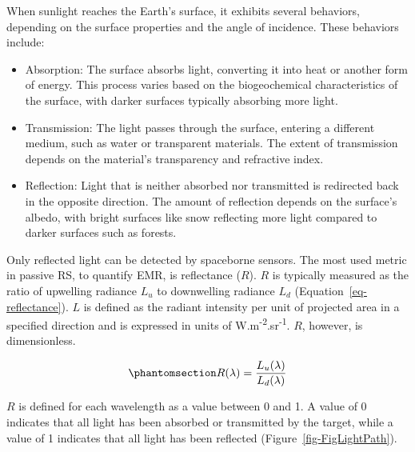 \documentclass[
  letterpaper,
  11pt,
  english,
  singlespacing,
  headsepline]{MastersDoctoralThesis}
\begin{document}
\begin{spacing}{1.5}
When sunlight reaches the Earth's surface, it exhibits several
behaviors, depending on the surface properties and the angle of
incidence. These behaviors include:

\begin{itemize}
\item
  Absorption: The surface absorbs light, converting it into heat or
  another form of energy. This process varies based on the
  biogeochemical characteristics of the surface, with darker surfaces
  typically absorbing more light.
\item
  Transmission: The light passes through the surface, entering a
  different medium, such as water or transparent materials. The extent
  of transmission depends on the material's transparency and refractive
  index.
\item
  Reflection: Light that is neither absorbed nor transmitted is
  redirected back in the opposite direction. The amount of reflection
  depends on the surface's albedo, with bright surfaces like snow
  reflecting more light compared to darker surfaces such as forests.
\end{itemize}

Only reflected light can be detected by spaceborne sensors. The most
used metric in passive RS, to quantify EMR, is reflectance (\(R\)).
\(R\) is typically measured as the ratio of upwelling radiance \(L_u\)
to downwelling radiance \(L_d\) (Equation~\ref{eq-reflectance}). \(L\)
is defined as the radiant intensity per unit of projected area in a
specified direction and is expressed in units of
W.m\textsuperscript{-2}.sr\textsuperscript{-1}. \(R\), however, is
dimensionless.

\begin{equation}\phantomsection\label{eq-reflectance}{
R(\lambda) = \frac{L_u(\lambda)}{L_d(\lambda)}
}\end{equation}

\(R\) is defined for each wavelength as a value between 0 and 1. A value
of 0 indicates that all light has been absorbed or transmitted by the
target, while a value of 1 indicates that all light has been reflected
(Figure~\ref{fig-FigLightPath}).

\begin{figure}

\centering{

}
\end{figure}
\end{spacing}
\end{document}
